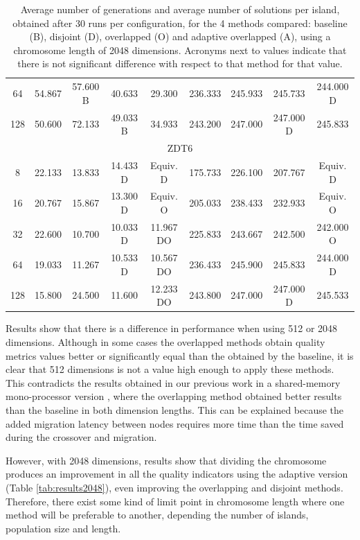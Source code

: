 \documentclass[Crown,sagev,times,doublespace]{sagej}
\begin{document}
\begin{table}
{\begin{tabular}{|c||c|c|c|c||c|c|c|c||}
64	&	54.867		&	57.600	B	&	40.633			&	29.300			&	236.333		&	245.933			&	245.733			&	244.000	D			\\
128	&	50.600		&	72.133		&	49.033	B		&	34.933			&	243.200		&	247.000			&	247.000	D		&	245.833				\\ \hline
\multicolumn{9}{|c|}{ZDT6}																															\\ \hline
8	&	22.133		&	13.833		&	14.433	D		&	Equiv. D			&	175.733		&	226.100			&	207.767			&	Equiv. D				\\
16	&	20.767		&	15.867		&	13.300	D		&	Equiv. O			&	205.033		&	238.433			&	232.933			&	Equiv. O				\\
32	&	22.600		&	10.700		&	10.033	D		&	11.967	DO		&	225.833		&	243.667			&	242.500			&	242.000	O			\\
64	&	19.033		&	11.267		&	10.533	D		&	10.567	DO		&	236.433		&	245.900			&	245.833			&	244.000	D			\\
128	&	15.800		&	24.500		&	11.600			&	12.233	DO		&	243.800		&	247.000			&	247.000	D		&	245.533				\\ \hline
\end{tabular}
}
\caption{Average number of generations and average number of solutions per island, obtained after 30 runs per configuration, for the 4 methods compared: baseline (B), disjoint (D), overlapped (O) and adaptive overlapped (A), using a chromosome length of 2048 dimensions. Acronyms next to values indicate that there is not significant difference with respect to that method for that value.}
\label{tab:sols2048}
\end{table}

Results show that there is a difference in performance when using 512 or 2048 dimensions. Although in some cases the overlapped methods obtain quality metrics values better or significantly equal than the obtained by the baseline, it is clear that 512 dimensions is not a value high enough to apply these methods. This contradicts the results obtained in our previous work in a shared-memory mono-processor version \citep{Garcia16hpmoonANONYMOUS}, where the overlapping method obtained better results than the baseline in both dimension lengths. This can be explained because the added migration latency between nodes requires more time than the time saved during the crossover and migration.

However, with 2048 dimensions, results show that dividing the chromosome produces an improvement in all the quality indicators using the adaptive version (Table \ref{tab:results2048}), even improving the overlapping and disjoint methods. Therefore, there exist some kind of limit point in chromosome length where one method will be preferable to another, depending the number of islands, population size and length.
\end{document}
